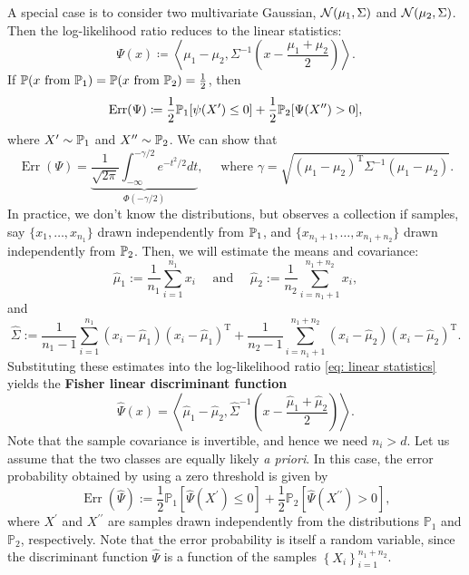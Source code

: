 A special case is to consider two multivariate Gaussian, $\mathcal{N}(\mu_1, \Sigma)$ and $\mathcal{N}(\mu_2, \Sigma)$. Then the log-likelihood ratio reduces to the linear statistics: 
\begin{equation}
\label{eq: linear statistics}
\Psi(x) \coloneqq \left< \mu_1 - \mu_2, \Sigma^{-1} \left( x - \frac{\mu _1 + \mu _2}{2} \right)  \right>.  
\end{equation}
If $ \mathbb{P}(x \text{ from } \mathbb{P}_1) = \mathbb{P}(x\text{ from }\mathbb{P}_2)=\frac{1}{2} $, then 
\[
    \mathrm{Err} (\Psi) \coloneqq \frac{1}{2} \mathbb{P}_1[\psi(X') \le 0 ] + \frac{1}{2} \mathbb{P}_2[\Psi(X'') >0], 
\] 
where $X'\sim \mathbb{P}_1$ and $X'' \sim \mathbb{P}_2$. We can show that 
\begin{equation}
\label{eq: error of linear stat}
\operatorname{Err}(\Psi)=\underbrace{\frac{1}{\sqrt{2 \pi}} \int_{-\infty}^{-\gamma / 2} e^{-t^2 / 2} d t}_{\Phi(-\gamma / 2)}, \quad \text { where } \gamma=\sqrt{\left(\mu_1-\mu_2\right)^{\mathrm{T}} {\Sigma}^{-1}\left(\mu_1-\mu_2\right)}. 
\end{equation}
In practice, we don't know the distributions, but observes a collection if samples, say $ \{x_1,\ldots ,x_{ n_1 } \}  $  drawn independently from $\mathbb{P}_1$, and $ \{x_{n_1+1},\ldots ,x_{n_1+n_2}\}  $ drawn independently from $\mathbb{P}_2$. Then, we will estimate the means and covariance:
\begin{equation}
\label{eq: LDA mean}
\hat{\mu}_1:=\frac{1}{n_1} \sum_{i=1}^{n_1} x_i \quad \text { and } \quad \hat{\mu}_2:=\frac{1}{n_2} \sum_{i=n_1+1}^{n_1+n_2} x_i,
\end{equation}
and 
\begin{equation}
\label{eq: LDA covariance}
\widehat{\Sigma}:=\frac{1}{n_1-1} \sum_{i=1}^{n_1}\left(x_i-\hat{\mu}_1\right)\left(x_i-\hat{\mu}_1\right)^{\mathrm{T}}+\frac{1}{n_2-1} \sum_{i=n_1+1}^{n_1+n_2}\left(x_i-\hat{\mu}_2\right)\left(x_i-\hat{\mu}_2\right)^{\mathrm{T}} .
\end{equation}
Substituting these estimates into the log-likelihood ratio \eqref{eq: linear statistics} yields the \textbf{Fisher linear discriminant function}
\begin{equation}
\label{eq: Fisher linear discrimination}
    \hat \Psi (x) = \left< \hat \mu_1 - \hat \mu_2, \hat \Sigma ^{-1}  \left( x - \frac{\hat \mu_1 + \hat \mu_2}{2} \right)  \right>. 
\end{equation}
Note that the sample covariance is invertible, and hence we need $n_i>d$. Let us assume that the two classes are equally likely \textit{a priori}. In this case, the error probability obtained by using a zero threshold is given by
$$
\operatorname{Err}(\widehat{\Psi}):=\frac{1}{2} \mathbb{P}_1\left[\widehat{\Psi}\left(X^{\prime}\right) \leq 0\right]+\frac{1}{2} \mathbb{P}_2\left[\widehat{\Psi}\left(X^{\prime \prime}\right)>0\right],
$$
where $X^{\prime}$ and $X^{\prime \prime}$ are samples drawn independently from the distributions $\mathbb{P}_1$ and $\mathbb{P}_2$, respectively. Note that the error probability is itself a random variable, since the discriminant function $\widehat{\Psi}$ is a function of the samples $\left\{X_i\right\}_{i=1}^{n_1+n_2}$.

